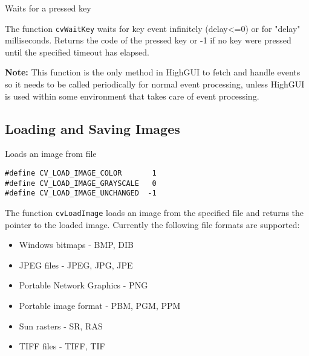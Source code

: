 
Waits for a pressed key


\begin{description}
\end{description}

The function \texttt{cvWaitKey} waits for key event infinitely (delay<=0) or for "delay" milliseconds. Returns the code of the pressed key or -1 if no key were pressed until the specified timeout has elapsed.

\textbf{Note:} This function is the only method in HighGUI to fetch and handle events so it needs to be called periodically for normal event processing, unless HighGUI is used within some environment that takes care of event processing.

\subsection{Loading and Saving Images}


Loads an image from file


\begin{lstlisting}
#define CV_LOAD_IMAGE_COLOR       1
#define CV_LOAD_IMAGE_GRAYSCALE   0
#define CV_LOAD_IMAGE_UNCHANGED  -1
\end{lstlisting}

\begin{description}
\end{description}

The function \texttt{cvLoadImage} loads an image from the specified file and returns the pointer to the loaded image. Currently the following file formats are supported:
\begin{itemize}
\item Windows bitmaps - BMP, DIB
\item JPEG files - JPEG, JPG, JPE
\item Portable Network Graphics - PNG
\item Portable image format - PBM, PGM, PPM
\item Sun rasters - SR, RAS
\item TIFF files - TIFF, TIF
\end{itemize}

